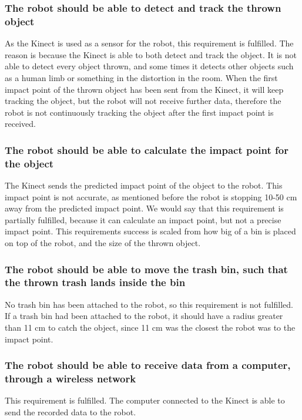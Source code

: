 \subsubsection{The robot should be able to detect and track the thrown object}
As the Kinect is used as a sensor for the robot, this requirement is fulfilled. The reason is because the Kinect is able to both detect and track the object. It is not able to detect every object thrown, and some times it detects other objects such as a human limb or something in the distortion in the room. \newline
When the first impact point of the thrown object has been sent from the Kinect, it will keep tracking the object, but the robot will not receive further data, therefore the robot is not continuously tracking the object after the first impact point is received.  


\subsubsection{The robot should be able to calculate the impact point for the object}
The Kinect sends the predicted impact point of the object to the robot. This impact point is not accurate, as mentioned before the robot is stopping 10-50 cm away from the predicted impact point. We would say that this requirement is partially fulfilled, because it can calculate an impact point, but not a precise impact point. This requirements success is scaled from how big of a bin is placed on top of the robot, and the size of the thrown object.


\subsubsection{The robot should be able to move the trash bin, such that the thrown trash lands inside the bin} 
No trash bin has been attached to the robot, so this requirement is not fulfilled. If a trash bin had been attached to the robot, it should have a radius greater than 11 cm to catch the object, since 11 cm was the closest the robot was to the impact point.


\subsubsection{The robot should be able to receive data from a computer, through a wireless network} This requirement is fulfilled. The computer connected to the Kinect is able to send the recorded data to the robot. 


